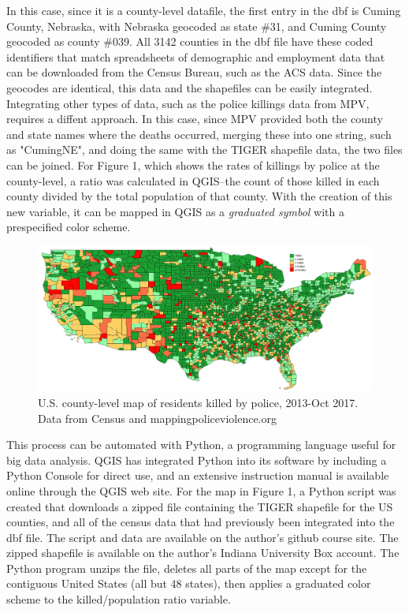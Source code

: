 \documentclass[sigconf]{acmart}
\begin{document}
In this case, since it is a county-level datafile, the first entry in the dbf is Cuming County, Nebraska, with Nebraska geocoded as state \#31, and Cuming County geocoded as county \#039.  All 3142 counties in the dbf file have these coded identifiers that match spreadsheets of demographic and employment data that can be downloaded from the Census Bureau, such as the ACS data.  Since the geocodes are identical, this data and the shapefiles can be easily integrated.  Integrating other types of data, such as the police killings data from MPV, requires a diffent approach.  In this case, since MPV provided both the county and state names where the deaths occurred, merging these into one string, such as "CumingNE", and doing the same with the TIGER shapefile data, the two files can be joined.  For Figure 1, which shows the rates of killings by police at the county-level, a ratio was calculated in QGIS--the count of those killed in each county divided by the total population of that county.  With the creation of this new variable, it can be mapped in QGIS as a {\em graduated symbol} with a prespecified color scheme. 

\begin{figure}
\includegraphics[width=1.0\textwidth]{images/figure1.jpg}
\caption{U.S. county-level map of residents killed by police, 2013-Oct 2017.  Data from Census and mappingpoliceviolence.org}
\end{figure}

This process can be automated with Python, a programming language useful for big data analysis. \cite{python}  QGIS has integrated Python into its software by including a Python Console for direct use, and an extensive instruction manual is available online through the QGIS web site. \cite{pyqgis}  For the map in Figure 1, a Python script was created that downloads a zipped file containing the TIGER shapefile for the US counties, and all of the census data that had previously been integrated into the dbf file. The script and data are available on the author's github course site. \cite{townsley} The zipped shapefile is available on the author's Indiana University Box account. \cite{townsley2} The Python program unzips the file, deletes all parts of the map except for the contiguous United States (all but 48 states), then applies a graduated color scheme to the killed/population ratio variable.
\end{document}
